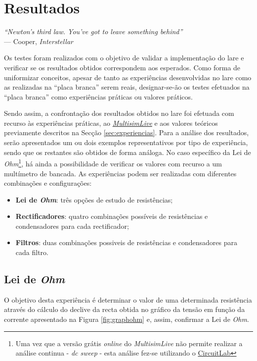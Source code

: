\chapter{Resultados}
\label{Capítulo5}

\begin{flushright}
\textit{``Newton's third law. You've got to leave something behind''} \\[0.5em]
--- Cooper, \textit{Interstellar}
\end{flushright}

Os testes foram realizados com o objetivo de validar a implementação do \acrshort{lare} e verificar se os resultados obtidos correspondem aos esperados. Como forma de uniformizar conceitos, apesar de tanto as experiências desenvolvidas no \acrshort{lare} como as realizadas na ``placa branca'' serem reais, designar-se-ão os testes efetuados na ``placa branca'' como experiências práticas ou valores práticos.

Sendo assim, a confrontação dos resultados obtidos no \acrshort{lare} foi efetuada com recurso às experiências práticas, ao \href{https://www.multisim.com}{\textit{MultisimLive}} e aos valores teóricos previamente descritos na Secção \ref{sec:experiencias}. Para a análise dos resultados, serão apresentados um ou dois exemplos representativos por tipo de experiência, sendo que os restantes são obtidos de forma análoga. No caso específico da Lei de \textit{Ohm}\footnote{Uma vez que a versão grátis \textit{online} do \textit{MultisimLive} não permite realizar a análise continua - \textit{dc sweep} - esta análise fez-se utilizando o \href{https://www.circuitlab.com/}{CircuitLab}}, há ainda a possibilidade de verificar os valores com recurso a um multímetro de bancada. As experiências podem ser realizadas com diferentes combinações e configurações:

\begin{itemize}
	\item \textbf{Lei de \textit{Ohm}}: três opções de estudo de resistências;
	\item \textbf{Rectificadores}: quatro combinações possíveis de resistências e condensadores para cada rectificador;
	\item \textbf{Filtros}: duas combinações possiveis de resistências e condensadores para cada filtro.
\end{itemize}

\section{Lei de \textit{Ohm}}
\label{sec:resultados_lei_de_ohm}
O objetivo desta experiência é determinar o valor de uma determinada resistência através do cálculo do declive da recta obtida no gráfico da tensão em função da corrente apresentado na Figura \ref{fig:graphohm} e, assim, confirmar a Lei de \textit{Ohm}.

